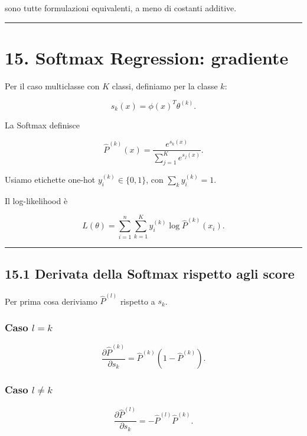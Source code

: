 \documentclass{article}
\begin{document}
sono tutte formulazioni equivalenti, a meno di costanti additive.

\begin{center}\rule{0.5\linewidth}{0.5pt}\end{center}

\section{15. Softmax Regression:
gradiente}\label{softmax-regression-gradiente}

Per il caso multiclasse con \(K\) classi, definiamo per la classe \(k\):

\[
s_k(x)=\phi(x)^T\theta^{(k)}.
\]

La Softmax definisce

\[
\hat P^{(k)}(x)
=
\frac{e^{s_k(x)}}{\sum_{j=1}^K e^{s_j(x)}}.
\]

Usiamo etichette one-hot \(y_i^{(k)}\in\{0,1\}\), con
\(\sum_k y_i^{(k)}=1\).

Il log-likelihood è

\[
L(\theta)
=
\sum_{i=1}^n\sum_{k=1}^K y_i^{(k)}\log \hat P^{(k)}(x_i).
\]

\begin{center}\rule{0.5\linewidth}{0.5pt}\end{center}

\subsection{15.1 Derivata della Softmax rispetto agli
score}\label{derivata-della-softmax-rispetto-agli-score}

Per prima cosa deriviamo \(\hat P^{(l)}\) rispetto a \(s_k\).

\subsubsection{\texorpdfstring{Caso \(l=k\)}{Caso l=k}}\label{caso-lk}

\[
\frac{\partial \hat P^{(k)}}{\partial s_k}
=
\hat P^{(k)}(1-\hat P^{(k)}).
\]

\subsubsection{\texorpdfstring{Caso
\(l\neq k\)}{Caso l\textbackslash neq k}}\label{caso-lneq-k}

\[
\frac{\partial \hat P^{(l)}}{\partial s_k}
=
-\hat P^{(l)}\hat P^{(k)}.
\]
\end{document}
